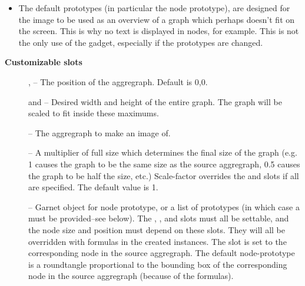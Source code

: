 \begin{description}
\begin{itemize}
\item                 The default prototypes (in particular the node
                prototype), are designed for the image to be used as
                an overview of a graph which perhaps doesn't fit on
                the screen.  This is why no text is displayed in
                nodes, for example.  This is not the only use of the
                gadget, especially if the prototypes are changed.
        \end{itemize}

\item[] {\bf Customizable slots}

        \begin{description}
\item[]                 ,  -- The position of the aggregraph.
                Default is 0,0.

\item[]                  and  -- Desired width
                and height of the entire graph.  The graph will be
                scaled to fit inside these maximums.

\item[]                  -- The aggregraph to make an image of.

\item[]                  -- A multiplier of full size which
		determines
                the final size of the graph (e.g. 1 causes the graph to be
                the same size as the source aggregraph, 0.5 causes the graph to
		be half the size, etc.)
                Scale-factor overrides the  and
                 slots if all are specified.
                The default value is 1.

\item[]                  -- Garnet object for node prototype, or a list
of prototypes (in which case a  must be
provided--see below).  The , ,  and 
slots must all be
settable, and the node size and position must depend on these slots.  They will
all be overridden with formulas in the created instances.
                The  slot is set to the corresponding node
                in the source aggregraph.  The default
                node-prototype is a roundtangle proportional to the bounding
                box of the corresponding node in the source aggregraph
(because of the formulas).


\end{description}
\end{description}
